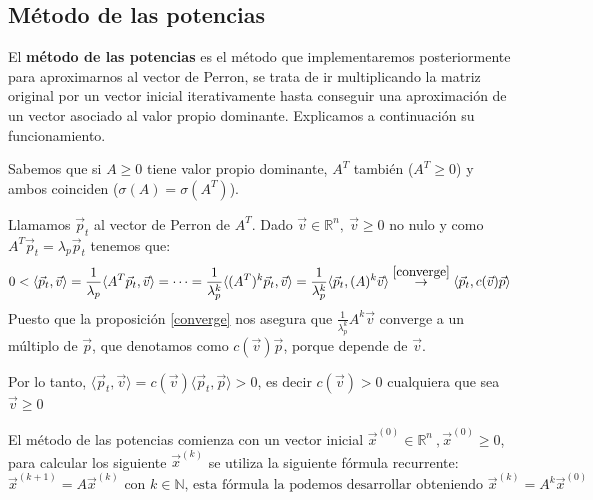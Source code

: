 \documentclass[size=a4, parskip=half, titlepage=false, toc=flat, toc=bib, 12pt]{scrartcl}
\theoremstyle{theorem-style}
\theoremstyle{definition-style}
\theoremstyle{remark-style}
\theoremstyle{example-style}
\theoremstyle{definition-style}
\theoremstyle{remark-style}
\begin{document}
\newpage

\subsection{Método de las potencias}

El \textbf{método de las potencias} es el método que implementaremos posteriormente para aproximarnos al vector de Perron, se trata de ir multiplicando la matriz original por un vector inicial iterativamente hasta conseguir una aproximación de un vector asociado al valor propio dominante. Explicamos a continuación su funcionamiento.

Sabemos que si $A \geq 0$ tiene valor propio dominante, $A^T$ también ($A^T \geq 0$) y
ambos coinciden ($\sigma(A) = \sigma(A^T)$).

Llamamos $\vec{p}_t$ al vector de Perron de $A^T$. Dado $\vec{v} \in \mathbb{R}^n , \ \vec{v} \geq 0$ no nulo y como $A^T \vec{p}_t = \lambda_p \vec{p}_t $ tenemos que:
$$0 < \langle \vec{p}_t, \vec{v} \rangle = \frac{1}{\lambda_p} \langle A^T \vec{p}_t, \vec{v} \rangle = \cdots = \frac{1}{\lambda_p^k} \langle (A^T)^k \vec{p}_t , \vec{v} \rangle =  \frac{1}{\lambda_p^k} \langle \vec{p}_t , (A)^k \vec{v} \rangle \overset{\ref{converge}} \rightarrow \langle \vec{p}_t , c(\vec{v})\vec{p} \rangle$$
Puesto que la proposición \ref{converge} nos asegura que $\frac{1}{\lambda_p^k} A^k \vec{v}$ converge a un múltiplo de $\vec{p}$, que denotamos como $c(\vec{v})\vec{p}$, porque depende de $\vec{v}$.

Por lo tanto, $\langle \vec{p}_t , \vec{v} \rangle = c(\vec{v}) \langle \vec{p}_t , \vec{p} \rangle > 0$, es decir $c(\vec{v}) >0$ cualquiera que sea $\vec{v} \geq 0$

El método de las potencias comienza con un vector inicial $\vec{x}^{(0)} \in \mathbb{R}^n  \ , \vec{x}^{(0)} \geq 0$, para calcular los siguiente $\vec{x}^{(k)}$ se utiliza la siguiente fórmula recurrente:
$$\vec{x}^{(k+1)} = A \vec{x}^{(k)} \textrm{ con } k \in \mathbb{N} \textrm{, esta fórmula la podemos desarrollar obteniendo } \vec{x}^{(k)} = A^k \vec{x}^{(0)}$$
\end{document}
